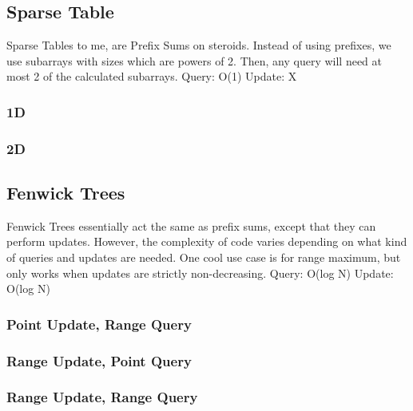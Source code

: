 \documentclass{article}
\begin{document}
\subsection{Sparse Table}
\begin{flushleft}
Sparse Tables to me, are Prefix Sums on steroids.
Instead of using prefixes, we use subarrays with sizes which are powers of 2.
Then, any query will need at most 2 of the calculated subarrays.
\newline
Query: O(1)
\newline
Update: X
\end{flushleft}

\subsubsection{1D}

\subsubsection{2D}


\subsection{Fenwick Trees}
\begin{flushleft}
Fenwick Trees essentially act the same as prefix sums,
except that they can perform updates. However, the complexity of code
varies depending on what kind of queries and updates are needed.
One cool use case is for range maximum, but only works when updates are strictly
non-decreasing.
\newline
Query: O(log N)
\newline
Update: O(log N)
\end{flushleft}

\subsubsection{Point Update, Range Query}

\subsubsection{Range Update, Point Query}

\subsubsection{Range Update, Range Query}

\end{document}
